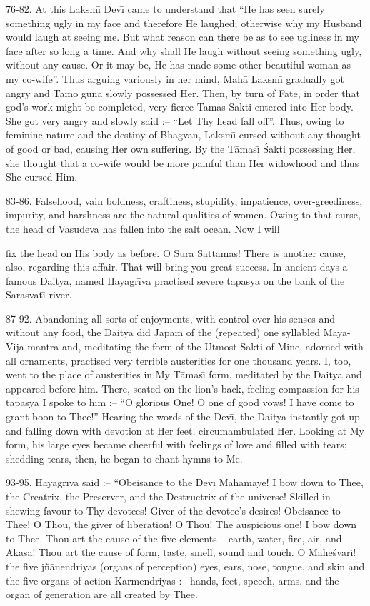 76-82. At this Laksm\={\i} Dev\={\i} came to understand that ``He has seen surely something ugly in my face and therefore He laughed; otherwise why my Husband would laugh at seeing me. But what reason can there be as to see ugliness in my face after so long a time. And why shall He laugh without seeing something ugly, without any cause. Or it may be, He has made some other beautiful woman as my co-wife''. Thus arguing variously in her mind, Mah\=a Laksm\={\i} gradually got angry and Tamo guna slowly possessed Her. Then, by turn of Fate, in order that god's work might be completed, very fierce Tamas Sakti entered into Her body. She got very angry and slowly said :-- ``Let Thy head fall off''. Thus, owing to feminine nature and the destiny of Bhagvan, Laksm\={\i} cursed without any thought of good or bad, causing Her own suffering. By the T\=amas\={\i} \'Sakti possessing Her, she thought that a co-wife would be more painful than Her widowhood and thus She cursed Him.

83-86. Falsehood, vain boldness, craftiness, stupidity, impatience, over-greediness, impurity, and harshness are the natural qualities of women. Owing to that curse, the head of Vasudeva has fallen into the salt ocean. Now I will

fix the head on His body as before. O Sura Sattamas! There is another cause, also, regarding this affair. That will bring you great success. In ancient days a famous Daitya, named Hayagr\={\i}va practised severe tapasya on the bank of the Sarasvat\={\i} river.

87-92. Abandoning all sorts of enjoyments, with control over his senses and without any food, the Daitya did Japam of the (repeated) one syllabled M\=ay\=a-Vija-mantra and, meditating the form of the Utmost Sakti of Mine, adorned with all ornaments, practised very terrible austerities for one thousand years. I, too, went to the place of austerities in My T\=amas\={\i} form, meditated by the Daitya and appeared before him. There, seated on the lion's back, feeling compassion for his tapasya I spoke to him :-- ``O glorious One! O one of good vows! I have come to grant boon to Thee!'' Hearing the words of the Dev\={\i}, the Daitya instantly got up and falling down with devotion at Her feet, circumambulated Her. Looking at My form, his large eyes became cheerful with feelings of love and filled with tears; shedding tears, then, he began to chant hymns to Me.

93-95. Hayagr\={\i}va said :-- ``Obeisance to the Dev\={\i} Mah\=amaye! I bow down to Thee, the Creatrix, the Preserver, and the Destructrix of the universe! Skilled in shewing favour to Thy devotees! Giver of the devotee's desires! Obeisance to Thee! O Thou, the giver of liberation! O Thou! The auspicious one! I bow down to Thee. Thou art the cause of the five elements -- earth, water, fire, air, and Akasa! Thou art the cause of form, taste, smell, sound and touch. O Mahe\'svari! the five j\~n\=anendriyas (organs of perception) eyes, ears, nose, tongue, and skin and the five organs of action Karmendriyas :-- hands, feet, speech, arms, and the organ of generation are all created by Thee.

